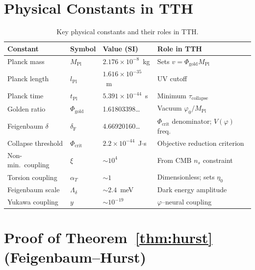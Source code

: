 \documentclass[12pt,a4paper]{article}
\newcommand{\MPl}{M_{\mathrm{Pl}}}
\newcommand{\phicrit}{\Phi_{\mathrm{crit}}}
\newcommand{\Feig}{\delta_{\mathrm{F}}}
\newcommand{\alphaT}{\alpha_T}
\numberwithin{equation}{section}
\begin{document}
\section{Physical Constants in TTH}

\begin{table}[htbp]
\centering
\caption{Key physical constants and their roles in TTH.}
\label{tab:constants}
\begin{tabular}{llll}
\toprule
\textbf{Constant} & \textbf{Symbol} & \textbf{Value (SI)} & \textbf{Role in TTH}\\
\midrule
Planck mass & $\MPl$ & $2.176\times10^{-8}$~kg & Sets $v = \Phi_{\mathrm{gold}}\MPl$\\
Planck length & $l_{\mathrm{Pl}}$ & $1.616\times10^{-35}$~m & UV cutoff\\
Planck time & $t_{\mathrm{Pl}}$ & $5.391\times10^{-44}$~s & Minimum $\tau_{\mathrm{collapse}}$\\
Golden ratio & $\Phi_{\mathrm{gold}}$ & 1.61803398\ldots & Vacuum $\varphi_0/\MPl$\\
Feigenbaum $\delta$ & $\Feig$ & 4.66920160\ldots & $\phicrit$ denominator; $V(\varphi)$ freq.\\
Collapse threshold & $\phicrit$ & $2.2\times10^{-44}$~J$\cdot$s & Objective reduction criterion\\
Non-min.\ coupling & $\xi$ & $\sim10^4$ & From CMB $n_s$ constraint\\
Torsion coupling & $\alphaT$ & $\sim1$ & Dimensionless; sets $\eta_0$\\
Feigenbaum scale & $\Lambda_\delta$ & $\sim2.4$~meV & Dark energy amplitude\\
Yukawa coupling & $y$ & $\sim10^{-19}$ & $\varphi$--neural coupling\\
\bottomrule
\end{tabular}
\end{table}

\section{Proof of Theorem~\ref{thm:hurst} (Feigenbaum--Hurst)}
\end{document}
